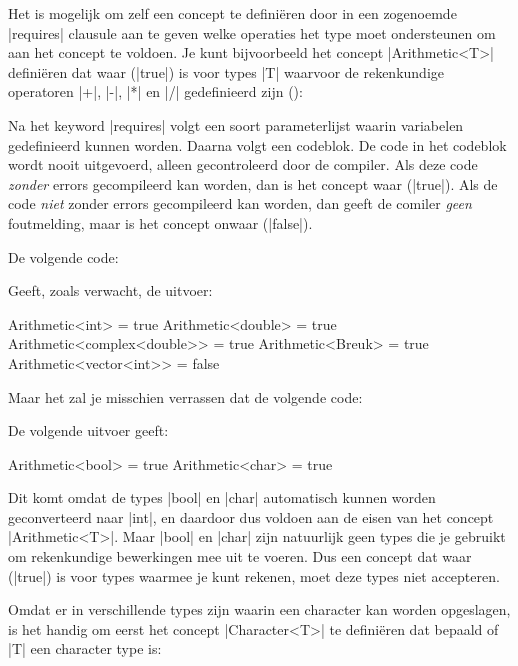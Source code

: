 \begin{cpplstShortInline}
Het is mogelijk om zelf een concept te definiëren door in een zogenoemde |requires| clausule aan te geven welke operaties het type moet ondersteunen om aan het concept te voldoen.
Je kunt bijvoorbeeld het concept |Arithmetic<T>| definiëren dat waar (|true|) is voor types |T| waarvoor de rekenkundige operatoren |+|, |-|, |*| en |/| gedefinieerd zijn ():

Na het keyword |requires| volgt een soort parameterlijst waarin variabelen gedefinieerd kunnen worden.
Daarna volgt een codeblok.
De code in het codeblok wordt nooit uitgevoerd, alleen gecontroleerd door de compiler.
Als deze code \emph{zonder} errors gecompileerd kan worden, dan is het concept waar (|true|).
Als de code \emph{niet} zonder errors gecompileerd kan worden, dan geeft de comiler \emph{geen} foutmelding, maar is het concept onwaar (|false|).

De volgende code:

Geeft, zoals verwacht, de uitvoer:
\begin{coutput}
Arithmetic<int> = true
Arithmetic<double> = true
Arithmetic<complex<double>> = true
Arithmetic<Breuk> = true
Arithmetic<vector<int>> = false
\end{coutput}

Maar het zal je misschien verrassen dat de volgende code:

De volgende uitvoer geeft:
\begin{coutput}
Arithmetic<bool> = true
Arithmetic<char> = true
\end{coutput}
Dit komt omdat de types |bool| en |char| automatisch kunnen worden geconverteerd naar |int|, en daardoor dus voldoen aan de eisen van het concept |Arithmetic<T>|.
Maar |bool| en |char| zijn natuurlijk geen types die je gebruikt om rekenkundige bewerkingen mee uit te voeren. 
Dus een concept dat waar (|true|) is voor types waarmee je kunt rekenen, moet deze types niet accepteren.

Omdat er in \Cpp{} verschillende types zijn waarin een character kan worden opgeslagen, is het handig om eerst het concept |Character<T>| te definiëren dat bepaald of |T| een character type is:


\end{cpplstShortInline}
